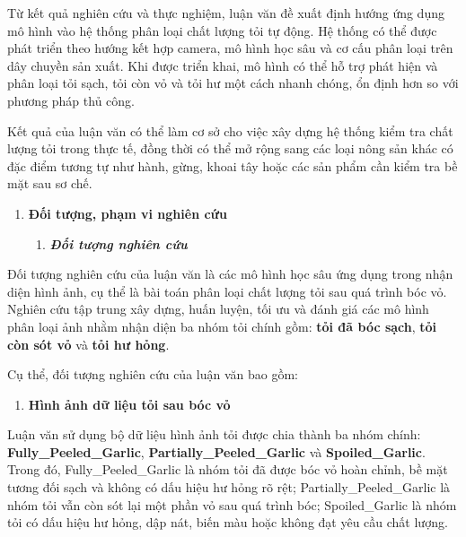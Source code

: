 \documentclass[
]{article}
\begin{document}
Từ kết quả nghiên cứu và thực nghiệm, luận văn đề xuất định hướng ứng
dụng mô hình vào hệ thống phân loại chất lượng tỏi tự động. Hệ thống có
thể được phát triển theo hướng kết hợp camera, mô hình học sâu và cơ cấu
phân loại trên dây chuyền sản xuất. Khi được triển khai, mô hình có thể
hỗ trợ phát hiện và phân loại tỏi sạch, tỏi còn vỏ và tỏi hư một cách
nhanh chóng, ổn định hơn so với phương pháp thủ công.

Kết quả của luận văn có thể làm cơ sở cho việc xây dựng hệ thống kiểm
tra chất lượng tỏi trong thực tế, đồng thời có thể mở rộng sang các loại
nông sản khác có đặc điểm tương tự như hành, gừng, khoai tây hoặc các
sản phẩm cần kiểm tra bề mặt sau sơ chế.

\begin{enumerate}
\def\labelenumi{\arabic{enumi}.}
\setcounter{enumi}{2}
\item
  \protect{}\label{_Toc232111984}{}\textbf{Đối tượng, phạm
  vi nghiên cứu}

  \begin{enumerate}
  \def\labelenumii{\arabic{enumii}.}
  \item
    \protect{}\label{_Toc232111985}{}\emph{\textbf{Đối
    tượng nghiên cứu}}
  \end{enumerate}
\end{enumerate}

Đối tượng nghiên cứu của luận văn là các mô hình học sâu ứng dụng trong
nhận diện hình ảnh, cụ thể là bài toán phân loại chất lượng tỏi sau quá
trình bóc vỏ. Nghiên cứu tập trung xây dựng, huấn luyện, tối ưu và đánh
giá các mô hình phân loại ảnh nhằm nhận diện ba nhóm tỏi chính gồm:
\textbf{tỏi đã bóc sạch}, \textbf{tỏi còn sót vỏ} và \textbf{tỏi hư
hỏng}.

Cụ thể, đối tượng nghiên cứu của luận văn bao gồm:

\begin{enumerate}
\def\labelenumi{\alph{enumi}.}
\item
  \textbf{Hình ảnh dữ liệu tỏi sau bóc vỏ}
\end{enumerate}

Luận văn sử dụng bộ dữ liệu hình ảnh tỏi được chia thành ba nhóm chính:
\textbf{Fully\_Peeled\_Garlic}, \textbf{Partially\_Peeled\_Garlic} và
\textbf{Spoiled\_Garlic}. Trong đó, Fully\_Peeled\_Garlic là nhóm tỏi đã
được bóc vỏ hoàn chỉnh, bề mặt tương đối sạch và không có dấu hiệu hư
hỏng rõ rệt; Partially\_Peeled\_Garlic là nhóm tỏi vẫn còn sót lại một
phần vỏ sau quá trình bóc; Spoiled\_Garlic là nhóm tỏi có dấu hiệu hư
hỏng, dập nát, biến màu hoặc không đạt yêu cầu chất lượng.
\end{document}
